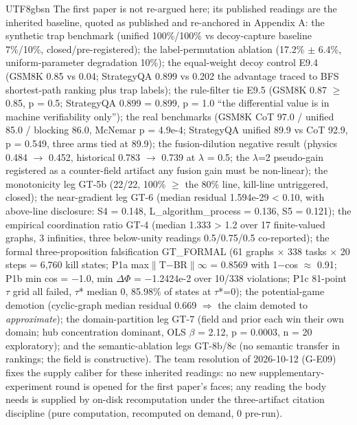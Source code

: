 \documentclass[11pt,letterpaper]{article}
\begin{document}
\begin{CJK}{UTF8}{gbsn}
The first paper is not re-argued here; its published readings are the inherited baseline, quoted as published and re-anchored in Appendix A: the synthetic trap benchmark (unified 100\%/100\% vs decoy-capture baseline 7\%/10\%, closed/pre-registered); the label-permutation ablation (17.2\% \ensuremath{\pm} 6.4\%, uniform-parameter degradation 10\%); the equal-weight decoy control E9.4 (GSM8K 0.85 vs 0.04; StrategyQA 0.899 vs 0.202 \textemdash{} the advantage traced to BFS shortest-path ranking plus trap labels); the rule-filter tie E9.5 (GSM8K 0.87 \ensuremath{\geq} 0.85, p = 0.5; StrategyQA 0.899 = 0.899, p = 1.0 \textemdash{} ``the differential value is in machine verifiability only''); the real benchmarks (GSM8K CoT 97.0 / unified 85.0 / blocking 86.0, McNemar p = 4.9e-4; StrategyQA unified 89.9 vs CoT 92.9, p = 0.549, three arms tied at 89.9); the fusion-dilution negative result (physics 0.484 \ensuremath{\to} 0.452, historical 0.783 \ensuremath{\to} 0.739 at \ensuremath{\lambda} = 0.5; the \ensuremath{\lambda}=2 pseudo-gain registered as a counter-field artifact \textemdash{} any fusion gain must be non-linear); the monotonicity leg GT-5b (22/22, 100\% \ensuremath{\geq} the 80\% line, kill-line untriggered, closed); the near-gradient leg GT-6 (median residual 1.594e-29 < 0.10, with above-line disclosure: S4 = 0.148, L\_algorithm\_process = 0.136, S5 = 0.121); the empirical coordination ratio GT-4 (median 1.333 > 1.2 over 17 finite-valued graphs, 3 infinities, three below-unity readings 0.5/0.75/0.5 co-reported); the formal three-proposition falsification GT\_FORMAL (61 graphs \ensuremath{\times} 338 tasks \ensuremath{\times} 20 steps = 6,760 kill states; P1a max\ensuremath{\|}T\ensuremath{-}BR\ensuremath{\|}\ensuremath{\infty} = 0.8569 with 1\ensuremath{-}cos \ensuremath{\approx} 0.91; P1b min cos = \ensuremath{-}1.0, min \ensuremath{\Delta}\ensuremath{\Phi} = \ensuremath{-}1.2424e-2 over 10/338 violations; P1c 81-point \ensuremath{\tau} grid all failed, \ensuremath{\tau}* median 0, 85.98\% of states at \ensuremath{\tau}*=0); the potential-game demotion (cyclic-graph median residual 0.669 \ensuremath{\Rightarrow} the claim demoted to \emph{approximate}); the domain-partition leg GT-7 (field and prior each win their own domain; hub concentration dominant, OLS \ensuremath{\beta} = 2.12, p = 0.0003, n = 20 exploratory); and the semantic-ablation legs GT-8b/8c (no semantic transfer in rankings; the field is constructive). The team resolution of 2026-10-12 (G-E09) fixes the supply caliber for these inherited readings: no new supplementary-experiment round is opened for the first paper's faces; any reading the body needs is supplied by on-disk recomputation under the three-artifact citation discipline (pure computation, recomputed on demand, 0 pre-run).


\end{CJK}
\end{document}

